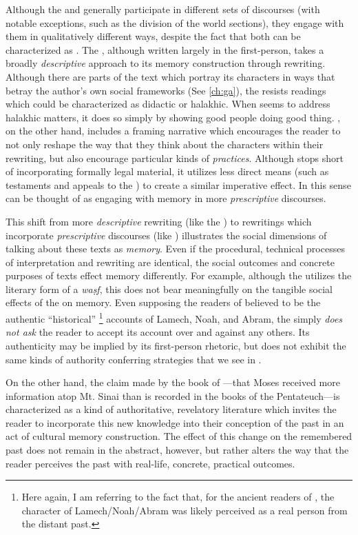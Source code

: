
Although the \ga and \jub generally participate in different sets of discourses (with notable exceptions, such as the division of the world sections), they engage with them in qualitatively different ways, despite the fact that both can be characterized as \psa. The \ga, although written largely in the first-person, takes a broadly \emph{descriptive} approach to its memory construction through rewriting. Although there are parts of the text which portray its characters in ways that betray the author's own social frameworks (See \ref{ch:ga}), the \ga resists readings which could be characterized as didactic or halakhic. When \ga seems to address halakhic matters, it does so simply by showing good people doing good thing. \jub, on the other hand, includes a framing narrative which encourages the reader to not only reshape the way that they think about the characters within their rewriting, but also encourage particular kinds of \emph{practices}. Although \jub stops short of incorporating formally legal material, it utilizes less direct means (such as testaments and appeals to the \HT) to create a similar imperative effect. In this sense \jub can be thought of as engaging with memory in more \emph{prescriptive} discourses.

This shift from more \emph{descriptive} rewriting (like the \ga) to rewritings which incorporate \emph{prescriptive} discourses (like \jub) illustrates the social dimensions of talking about these texts as \emph{memory}. Even if the procedural, technical processes of interpretation and rewriting are identical, the social outcomes and concrete purposes of texts effect memory differently. For example, although the \ga utilizes the literary form of a \emph{waṣf}, this does not bear meaningfully on the tangible social effects of the \ga on memory. Even supposing the readers of \ga believed \ga to be the authentic ``historical''%
    \footnote{Here again, I am referring to the fact that, for the ancient readers of \jub, the character of Lamech/Noah/Abram was likely perceived as a real person from the distant past.}
accounts of Lamech, Noah, and Abram, the \ga simply \emph{does not ask} the reader to accept its account over and against any others. Its authenticity may be implied by its first-person rhetoric, but \ga does not exhibit the same kinds of authority conferring strategies that we see in \jub. 

On the other hand, the claim made by the book of \jub---that Moses received more information atop Mt. Sinai than is recorded in the books of the Pentateuch---is characterized as a kind of authoritative, revelatory literature which invites the reader to incorporate this new knowledge into their conception of the past in an act of cultural memory construction. The effect of this change on the remembered past does not remain in the abstract, however, but rather alters the way that the reader perceives the past with real-life, concrete, practical outcomes. 
